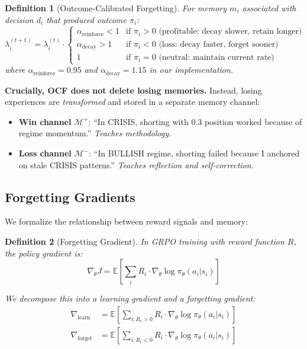 \documentclass[11pt, a4paper]{article}
\newtheorem{definition}{Definition}
\begin{document}
\begin{definition}[Outcome-Calibrated Forgetting]
For memory $m_i$ associated with decision $d_i$ that produced outcome $\pi_i$:
\begin{equation}
  \lambda_i^{(t+1)} = \lambda_i^{(t)} \cdot \begin{cases}
    \alpha_{\text{reinforce}} < 1 & \text{if } \pi_i > 0 \text{ (profitable: decay slower, retain longer)} \\
    \alpha_{\text{decay}} > 1 & \text{if } \pi_i < 0 \text{ (loss: decay faster, forget sooner)} \\
    1 & \text{if } \pi_i = 0 \text{ (neutral: maintain current rate)}
  \end{cases}
\end{equation}
where $\alpha_{\text{reinforce}} = 0.95$ and $\alpha_{\text{decay}} = 1.15$ in our implementation.
\end{definition}

\textbf{Crucially, OCF does not delete losing memories.} Instead, losing experiences are \emph{transformed} and stored in a separate memory channel:

\begin{itemize}
  \item \textbf{Win channel} $\mathcal{M}^+$: ``In CRISIS, shorting with 0.3 position worked because of regime momentum.'' \emph{Teaches methodology}.
  \item \textbf{Loss channel} $\mathcal{M}^-$: ``In BULLISH regime, shorting failed because I anchored on stale CRISIS patterns.'' \emph{Teaches reflection and self-correction}.
\end{itemize}

\subsection{Forgetting Gradients}

We formalize the relationship between reward signals and memory:

\begin{definition}[Forgetting Gradient]
In GRPO training with reward function $R$, the policy gradient is:
\begin{equation}
  \nabla_\theta J = \mathbb{E}\left[\sum_i R_i \cdot \nabla_\theta \log \pi_\theta(a_i | s_i)\right]
\end{equation}

We decompose this into a \emph{learning gradient} and a \emph{forgetting gradient}:
\begin{align}
  \nabla_{\text{learn}} &= \mathbb{E}\left[\sum_{i: R_i > 0} R_i \cdot \nabla_\theta \log \pi_\theta(a_i | s_i)\right] \label{eq:learn} \\
  \nabla_{\text{forget}} &= \mathbb{E}\left[\sum_{i: R_i < 0} R_i \cdot \nabla_\theta \log \pi_\theta(a_i | s_i)\right] \label{eq:forget}
\end{align}
\end{definition}
\end{document}
